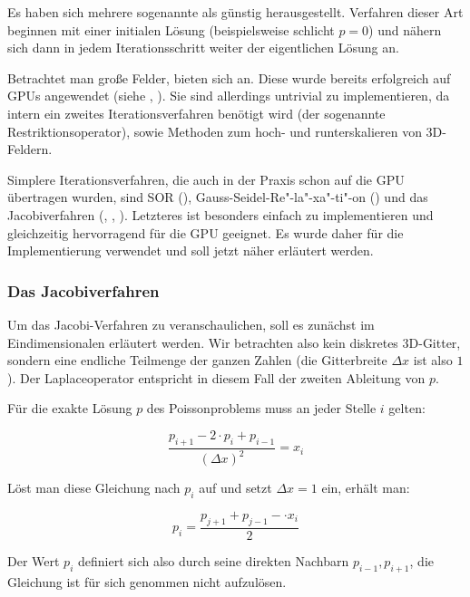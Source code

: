 Es haben sich mehrere sogenannte  als
günstig herausgestellt. Verfahren dieser Art beginnen mit einer initialen Lösung
(beispielsweise schlicht $p=0$) und nähern sich dann in jedem Iterationsschritt
weiter der eigentlichen Lösung an.

Betrachtet man große Felder, bieten sich 
an. Diese wurde bereits erfolgreich auf GPUs angewendet (siehe \cite{Bolz2002},
\cite{Matthias2006}). Sie sind allerdings untrivial zu implementieren, da intern
ein zweites Iterationsverfahren benötigt wird (der sogenannte
Restriktionsoperator), sowie Methoden zum hoch- und runterskalieren von
3D-Feldern.

Simplere Iterationsverfahren, die auch in der Praxis schon auf die GPU
übertragen wurden, sind SOR (\cite{Saltvik2006}),
Gauss-Seidel-Re"-la"-xa"-ti"-on (\cite{Stam2003}) und das
Jacobiverfahren (\cite{Crane2007}, \cite{Harris2008},
\cite{Peschel2009}). Letzteres ist besonders einfach zu implementieren
und gleichzeitig hervorragend für die GPU geeignet. Es wurde daher für
die Implementierung verwendet und soll jetzt näher erläutert werden.

\subsubsection{Das Jacobiverfahren}

Um das Jacobi-Verfahren zu veranschaulichen, soll es zunächst im
Eindimensionalen erläutert werden. Wir betrachten also kein diskretes 3D-Gitter,
sondern eine endliche Teilmenge der ganzen Zahlen (die Gitterbreite $\Delta x$
ist also $1$). Der Laplaceoperator entspricht in diesem Fall der zweiten
Ableitung von $p$.

Für die exakte Lösung $p$ des Poissonproblems muss an jeder Stelle $i$ gelten:

\begin{equation}
\label{eq:stam_jacobi_onedimensional}
\frac{
	p_{i+1} -
	2 \cdot p_{i} +
	p_{i-1}
}
{
	(\Delta x)^2
}
=
x_i
\end{equation}

Löst man diese Gleichung nach $p_i$ auf und setzt $\Delta x = 1$ ein, erhält
man:

\begin{equation}
p_i
=
\frac{
	p_{j+1} +
	p_{j-1} -
	\cdot x_i
}
{
	2
}
\end{equation}

Der Wert $p_i$ definiert sich also durch seine direkten Nachbarn $p_{i-1},
p_{i+1}$, die Gleichung ist für sich genommen nicht aufzulösen.

